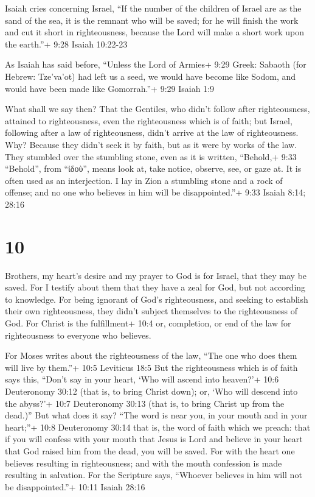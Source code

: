  Isaiah cries concerning Israel, ``If the number of the
children of Israel are as the sand of the sea, it is the remnant who
will be saved;  for he will finish the work and cut it
short in righteousness, because the Lord will make a short work upon the
earth.''+ 9:28 Isaiah 10:22-23

 As Isaiah has said before, ``Unless the Lord of Armies+
9:29 Greek: Sabaoth (for Hebrew: Tze'va'ot) had left us a seed, we would
have become like Sodom, and would have been made like Gomorrah.''+ 9:29
Isaiah 1:9

 What shall we say then? That the Gentiles, who didn't
follow after righteousness, attained to righteousness, even the
righteousness which is of faith;  but Israel, following
after a law of righteousness, didn't arrive at the law of righteousness.
 Why? Because they didn't seek it by faith, but as it were
by works of the law. They stumbled over the stumbling stone,
 even as it is written, ``Behold,+ 9:33 ``Behold'', from
``ἰδοὺ'', means look at, take notice, observe, see, or gaze at. It is
often used as an interjection. I lay in Zion a stumbling stone and a
rock of offense; and no one who believes in him will be disappointed.''+
9:33 Isaiah 8:14; 28:16

\hypertarget{section-9}{%
\section{10}\label{section-9}}

 Brothers, my heart's desire and my prayer to God is for
Israel, that they may be saved.  For I testify about them
that they have a zeal for God, but not according to knowledge.
 For being ignorant of God's righteousness, and seeking to
establish their own righteousness, they didn't subject themselves to the
righteousness of God.  For Christ is the fulfillment+ 10:4
or, completion, or end of the law for righteousness to everyone who
believes.

 For Moses writes about the righteousness of the law, ``The
one who does them will live by them.''+ 10:5 Leviticus 18:5 
But the righteousness which is of faith says this, ``Don't say in your
heart, `Who will ascend into heaven?'+ 10:6 Deuteronomy 30:12 (that is,
to bring Christ down);  or, `Who will descend into the
abyss?'+ 10:7 Deuteronomy 30:13 (that is, to bring Christ up from the
dead.)''  But what does it say? ``The word is near you, in
your mouth and in your heart;''+ 10:8 Deuteronomy 30:14 that is, the
word of faith which we preach:  that if you will confess
with your mouth that Jesus is Lord and believe in your heart that God
raised him from the dead, you will be saved.  For with the
heart one believes resulting in righteousness; and with the mouth
confession is made resulting in salvation.  For the
Scripture says, ``Whoever believes in him will not be disappointed.''+
10:11 Isaiah 28:16

